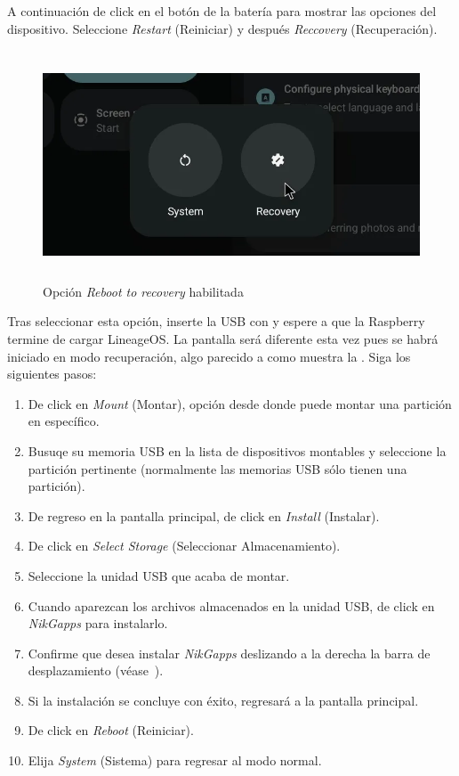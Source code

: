 \documentclass[letterpaper,10.5pt]{article}
\begin{document}
A continuación de click en el botón de la batería para mostrar las opciones del dispositivo.
Seleccione \emph{Restart} (Reiniciar) y después \emph{Reccovery} (Recuperación).

\begin{figure}[H]
	\centering
	\includegraphics[width=0.9\linewidth,height=68mm,keepaspectratio]{img/p02-05-recovery-restart.png} %
	\caption{Opción \emph{Reboot to recovery} habilitada}
	\label{fig:recovery-restart} %
\end{figure}

Tras seleccionar esta opción, inserte la USB con y espere a que la Raspberry termine de cargar LineageOS. %
La pantalla será diferente esta vez pues se habrá iniciado en modo recuperación, algo parecido a como muestra la .
Siga los siguientes pasos:

\begin{enumerate}
	\item De click en \emph{Mount} (Montar), opción desde donde puede montar una partición en específico.
	\item Busuqe su memoria USB en la lista de dispositivos montables y seleccione la partición pertinente (normalmente las memorias USB sólo tienen una partición).
	\item De regreso en la pantalla principal, de click en \emph{Install} (Instalar).
	\item De click en \emph{Select Storage} (Seleccionar Almacenamiento).
	\item Seleccione la unidad USB que acaba de montar.
	\item Cuando aparezcan los archivos almacenados en la unidad USB, de click en \emph{NikGapps} para instalarlo.
	\item Confirme que desea instalar \emph{NikGapps} deslizando a la derecha la barra de desplazamiento (véase~).
	\item Si la instalación se concluye con éxito, regresará a la pantalla principal.
	\item De click en \emph{Reboot} (Reiniciar).
	\item Elija \emph{System} (Sistema) para regresar al modo normal.
\end{enumerate}
\end{document}
